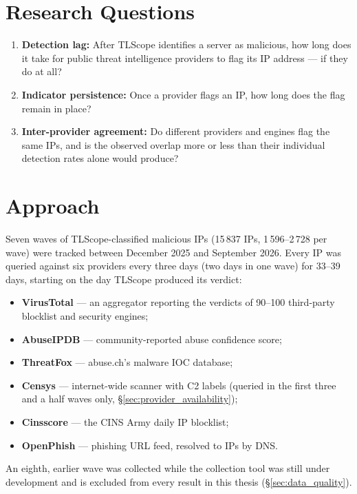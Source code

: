 \section{Research Questions}

\begin{enumerate}[label=\textbf{RQ\arabic*.}]
  \item \textbf{Detection lag:} After TLScope identifies a server as malicious, how long does it
    take for public threat intelligence providers to flag its IP address --- if they do at all?
  \item \textbf{Indicator persistence:} Once a provider flags an IP, how long does the flag
    remain in place?
  \item \textbf{Inter-provider agreement:} Do different providers and engines flag the same IPs,
    and is the observed overlap more or less than their individual detection rates alone would
    produce?
\end{enumerate}

\section{Approach}

Seven waves of TLScope-classified malicious IPs (15\,837 IPs, 1\,596--2\,728 per wave) were tracked
between December 2025 and September 2026. Every IP was queried against six providers every three
days (two days in one wave) for 33--39 days, starting on the day TLScope produced its verdict:

\begin{itemize}
  \item \textbf{VirusTotal} --- an aggregator reporting the verdicts of 90--100 third-party
    blocklist and security engines;
  \item \textbf{AbuseIPDB} --- community-reported abuse confidence score;
  \item \textbf{ThreatFox} --- abuse.ch's malware IOC database;
  \item \textbf{Censys} --- internet-wide scanner with C2 labels (queried in the first three and a
    half waves only, \S\ref{sec:provider_availability});
  \item \textbf{Cinsscore} --- the CINS Army daily IP blocklist;
  \item \textbf{OpenPhish} --- phishing URL feed, resolved to IPs by DNS.
\end{itemize}

An eighth, earlier wave was collected while the collection tool was still under development and is
excluded from every result in this thesis (\S\ref{sec:data_quality}).

